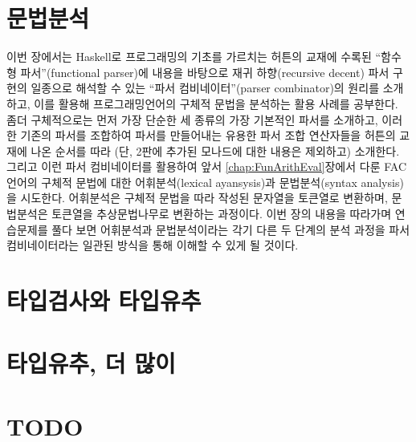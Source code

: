 \chapter{문법분석}\label{chap:parser}
이번 장에서는 Haskell로 프로그래밍의 기초를 가르치는
허튼\cite{Hutton2016pih2nd}의 교재에 수록된
``함수형 파서''(functional parser)에 내용을 바탕으로
재귀 하향(recursive decent) 파서 구현의 일종으로 해석할 수 있는
``파서 컴비네이터''(parser combinator)의 원리를 소개하고,
이를 활용해 프로그래밍언어의 구체적 문법을 분석하는 활용 사례를 공부한다.
좀더 구체적으로는 먼저 가장 단순한 세 종류의 가장 기본적인 파서를 소개하고,
이러한 기존의 파서를 조합하여 파서를 만들어내는 유용한 파서 조합 연산자들을
허튼의 교재에 나온 순서를 따라 (단, 2판에 추가된 모나드에 대한
내용은 제외하고) 소개한다. 그리고 이런 파서 컴비네이터를 활용하여
앞서 \ref{chap:FunArithEval}장에서 다룬 FAC언어의 구체적 문법에 대한
어휘분석(lexical ayansysis)과 문법분석(syntax analysis)을 시도한다.
어휘분석은 구체적 문법을 따라 작성된 문자열을 토큰열로 변환하며,
문법분석은 토큰열을 추상문법나무로 변환하는 과정이다.
이번 장의 내용을 따라가며 연습문제를 풀다 보면
어휘분석과 문법분석이라는 각기 다른 두 단계의 분석 과정을
파서 컴비네이터라는 일관된 방식을 통해 이해할 수 있게 될 것이다.
\newpage


\chapter{타입검사와 타입유추}\label{chap:TyChk}


\chapter{타입유추, 더 많이}\label{chap:TyInf}



\chapter{TODO}



